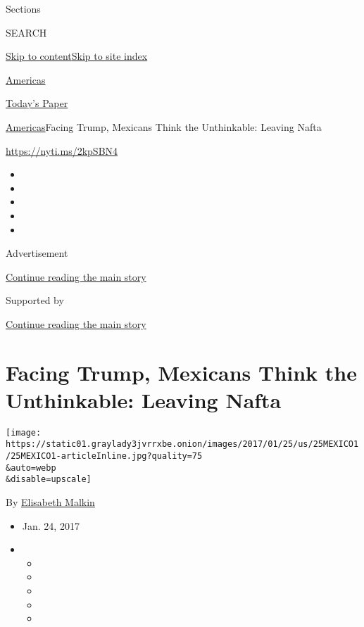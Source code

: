 Sections

SEARCH

\protect\hyperlink{site-content}{Skip to
content}\protect\hyperlink{site-index}{Skip to site index}

\href{https://www.nytimes3xbfgragh.onion/section/world/americas}{Americas}

\href{https://myaccount.nytimes3xbfgragh.onion/auth/login?response_type=cookie\&client_id=vi}{}

\href{https://www.nytimes3xbfgragh.onion/section/todayspaper}{Today's
Paper}

\href{/section/world/americas}{Americas}\textbar{}Facing Trump, Mexicans
Think the Unthinkable: Leaving Nafta

\url{https://nyti.ms/2kpSBN4}

\begin{itemize}
\item
\item
\item
\item
\item
\end{itemize}

Advertisement

\protect\hyperlink{after-top}{Continue reading the main story}

Supported by

\protect\hyperlink{after-sponsor}{Continue reading the main story}

\hypertarget{facing-trump-mexicans-think-the-unthinkable-leaving-nafta}{%
\section{Facing Trump, Mexicans Think the Unthinkable: Leaving
Nafta}\label{facing-trump-mexicans-think-the-unthinkable-leaving-nafta}}

\texttt{[image: https://static01.graylady3jvrrxbe.onion/images/2017/01/25/us/25MEXICO1/25MEXICO1-articleInline.jpg?quality=75\\\&auto=webp\\\&disable=upscale]}

By
\href{https://www.nytimes3xbfgragh.onion/by/elisabeth-malkin}{Elisabeth
Malkin}

\begin{itemize}
\item
  Jan. 24, 2017
\item
  \begin{itemize}
  \item
  \item
  \item
  \item
  \item
  \end{itemize}
\end{itemize}

